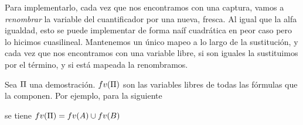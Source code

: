 Para implementarlo, cada vez que nos encontramos con una captura, vamos a \textit{renombrar} la variable del cuantificador por una nueva, fresca. Al igual que la alfa igualdad, esto se puede implementar de forma naíf cuadrática en peor caso pero lo hicimos cuasilineal. Mantenemos un único mapeo a lo largo de la sustitución, y cada vez que nos encontramos con una variable libre, si son iguales la sustituimos por el término, y si está mapeada la renombramos.

\begin{definition} Sea $\Pi$ una demostración. $fv(\Pi)$ son las variables libres de todas las fórmulas que la componen. Por ejemplo, para la siguiente

    \proofTreeAndI

    se tiene $fv(\Pi) = fv(A) \cup fv(B)$
    
\end{definition}
